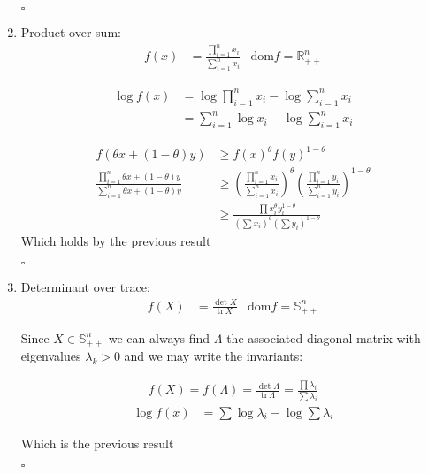 \documentclass[a4paper,11pt]{article}
\begin{document}
\begin{enumerate}
\hspace{15.5cm}$\square$

\newpage
\item Product over sum:
\begin{equation}
\begin{aligned}
f(x)&=\frac{\prod^n_{i=1}x_i}{\sum^n_{i=1}x_i} & \text{dom} f = \mathbb{R}_{++}^n
\end{aligned}
\end{equation}

\begin{equation}
\begin{aligned}
\log f(x) &= \log \prod^n_{i=1} x_i - \log \sum^n_{i=1} x_i \\
&= \sum^n_{i=1}\log x_i - \log \sum^n_{i=1}x_i
\end{aligned}
\end{equation}

\begin{equation}
\begin{aligned}
f(\theta x + (1-\theta)y) &\geq f(x)^\theta f(y)^{1-\theta} \\
\frac{\prod^n_{i=1} \theta x + (1-\theta)y}{\sum ^n_{i=1}  \theta x + (1-\theta)y} &\geq \left(\frac{\prod ^n_{i=1} x_i}{\sum ^n_{i=1} x_i}\right)^\theta\left(\frac{\prod ^n_{i=1} y_i}{\sum ^n_{i=1} y_i}\right)^{1-\theta} \\
&\geq \frac{\prod x^\theta_i y_i^{1-\theta}}{(\sum x_i)^\theta (\sum y_i)^{1-\theta}}
\end{aligned}
\end{equation}
Which holds by the previous result

\hspace{15.5cm}$\square$

\item Determinant over trace:
\begin{equation}
\begin{aligned}
f(X)&=\frac{\det X}{\text{tr} \, X} & \text{dom} f = \mathbb{S}_{++}^n
\end{aligned}
\end{equation}

Since $X \in \mathbb{S}_{++}^n$ we can always find $\Lambda$ the associated diagonal matrix with eigenvalues $\lambda_k >0$ and we may write the invariants:

\begin{equation}
\begin{aligned}
f(X) = f(\Lambda) = \frac{\det \Lambda}{\text{tr} \, \Lambda} = \frac{\prod \lambda_i}{\sum \lambda_i}
\end{aligned}
\end{equation}
\begin{equation}
\begin{aligned}
\log f(x) &= \sum \log \lambda_i - \log \sum \lambda_i
\end{aligned}
\end{equation}

Which is the previous result

\hspace{15.5cm}$\square$

\end{enumerate}
\end{document}
